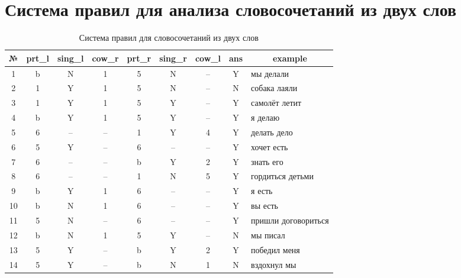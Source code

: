 \documentclass[main]{subfiles}
\begin{document}
\section{Система правил для анализа словосочетаний из двух слов}\label{app:B}
\begin{table}[!h]
	\begin{center}
		\captionsetup{format=hang,labelsep = endash, singlelinecheck=false}
	\caption{Система правил для словосочетаний из двух слов}
		\begin{tabular}{|c|c|c|c|c|c|c|c|p{90px}|}
			\hline
			\textbf{№} & \textbf{prt\_l} &\textbf{ sing\_l}  & \textbf{cow\_r} & \textbf{prt\_r }& \textbf{sing\_r} & \textbf{cow\_l} & \textbf{ans}  & \multicolumn{1}{c|}{\textbf{example}} \\ \hline
			1 & b & N & 1 & 5 & N & --  & Y  & мы делали \\ \hline
			2 &  1 &Y & 1 & 5 & N & -- & N & собака лаяли\\ \hline
			3 & 1 & Y & 1 & 5 & Y & -- & Y & самолёт летит\\ \hline 
			4 & b & Y & 1 & 5 & Y & -- & Y & я делаю \\ \hline
			5&6&--&--&1&Y&4&Y&делать дело\\ \hline
			6&5&Y&--&6&--&--&Y&хочет есть\\ \hline
			7&6&--&--&b&Y&2&Y&знать его\\ \hline
			8&6&--&--&1&N&5&Y&гордиться детьми\\ \hline
			9&b&Y&1&6&--&--&Y&я есть\\ \hline
			10&b&N&1&6&--&--&Y&вы есть \\ \hline
			11&5&N&--&6&--&--&Y&пришли договориться\\ \hline
			12&b&N&1&5&Y&--&N&мы писал\\ \hline
			13&5&Y&--&b&Y&2&Y&победил меня\\ \hline
			14&5&Y&--&b&N&1&N&вздохнул мы\\ \hline
		\end{tabular}
	\end{center}
\end{table}
\end{document}
